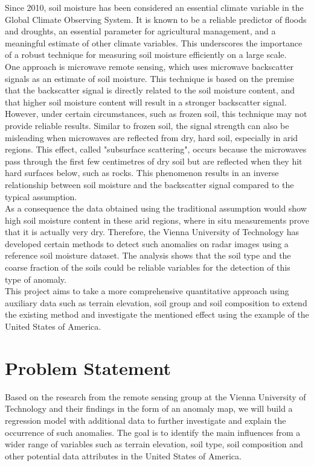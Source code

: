 \documentclass[12pt]{article}
\begin{document}
Since 2010, soil moisture has been considered an essential climate variable in the Global Climate Observing System. It is known to be a reliable predictor of floods and droughts, an essential parameter for agricultural management, and a meaningful estimate of other climate variables.\cite{Morrison2020} This underscores the importance of a robust technique for measuring soil moisture efficiently on a large scale.\\
One approach is microwave remote sensing, which uses microwave backscatter signals as an estimate of soil moisture. This technique is based on the premise that the backscatter signal is directly related to the soil moisture content, and that higher soil moisture content will result in a stronger backscatter signal. However, under certain circumstances, such as frozen soil, this technique may not provide reliable results. Similar to frozen soil, the signal strength can also be misleading when microwaves are reflected from dry, hard soil, especially in arid regions. This effect, called "subsurface scattering", occurs because the microwaves pass through the first few centimetres of dry soil but are reflected when they hit hard surfaces below, such as rocks. This phenomenon results in an inverse relationship between soil moisture and the backscatter signal compared to the typical assumption.\cite{Wagner2022} \\
As a consequence the data obtained using the traditional assumption would show high soil moisture content in these arid regions, where in situ measurements prove that it is actually very dry. Therefore, the Vienna University of Technology has developed certain methods to detect such anomalies on radar images using a reference soil moisture dataset. The analysis shows that the soil type and the coarse fraction of the soils could be reliable variables for the detection of this type of anomaly. \cite{Wagner2024}\\ 
This project aims to take a more comprehensive quantitative approach using auxiliary data such as terrain elevation, soil group and soil composition to extend the existing method and investigate the mentioned effect using the example of the United States of America.

\section{Problem Statement}
Based on the research from the remote sensing group at the Vienna University of Technology and their findings in the form of an anomaly map, we will build a regression model with additional data to further investigate and explain the occurrence of such anomalies. The goal is to identify the main influences from a wider range of variables such as terrain elevation, soil type, soil composition and other potential data attributes in the United States of America.
\end{document}
